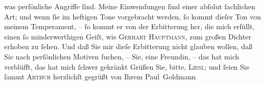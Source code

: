 \begin{ledgroupsized}[t]{13cm}
               was perſönliche Angriffe ſind. Meine Einwendungen ſind einer abſolut ſachlichen Art;
               und wenn ſie im heftigen Tone vorgebracht werden, ſo kommt dieſer Ton von meinem
               Temperament, – ſo kommt er von der Erbitterung her, die mich erfüllt, einen ſo
               minderwerthigen Geiſt, wie \textsc{Gerhart Hauptmann}, zum großen Dichter erhoben zu ſehen. Und daß Sie mir dieſe Erbitterung nicht
               glauben wollen, daß Sie nach perſönlichen Motiven ſuchen, – Sie, eine Freundin, – das
               hat mich verblüfft, das hat mich ſchwer gekränkt{\dotsfive}\pend
           \pstart Grüßen Sie, bitte, \textsc{Liesl}; und ſeien Sie ſammt \textsc{Arthur} herzlichſt gegrüßt von Ihrem \spacefill\mbox{Paul Goldmann}\pend{}
         
         \endnumbering{}\end{ledgroupsized}  \newcommand{\dateiname}{L03535}\newcommand{\titel}{Paul Goldmann an Olga Gussmann, 15. 11. [1901]}\newcommand{\editorInnen}{Martin Anton Müller und Laura Untner}
      